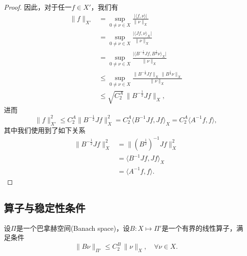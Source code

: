 \begin{proof}
因此，对于任一$f \in X'$，我们有
\begin{equation*}
  \begin{split}
    \| f \|_{X'} &= \sup_{0 \neq \nu \in X} \frac{
    \big| \langle f,\nu \rangle \big|
    }{
    \big\| \nu \big\|_{X}
    }\\
    &= \sup_{0 \neq \nu \in X}
    \frac{
    \big| \langle J f, \nu \rangle_X \big|
    }{
    \big\| \nu \big\|_X
    } \\
    &= \sup_{0 \neq \nu \in X}
    \frac{
    \big| \langle B^{-\frac{1}{2}} J f, B^{\frac{1}{2}} \nu \rangle_X \big|
    }{
    \big\| \nu \big\|_X
    } \\
    &\le \sup_{0 \neq \nu \in X}
    \frac{
    \big\| B^{-\frac{1}{2}} J f \big\|_{X} \, \big\| B^{\frac{1}{2}} \nu \big\|_{X}
    }{
    \big\| \nu \big\|_X
    } \\
    &\le \sqrt{C_2^A} \, \big\| B^{-\frac{1}{2}} J f \big\|_{X},
  \end{split}
\end{equation*}
进而
\begin{equation*}
  \big\| f \big\|_{X'}^2 \le C_2^A \big\| B^{-\frac{1}{2}} J f \big\|_{X}^2 = C_2^A \langle B^{-1} J f, J f \rangle_X = C_2^A \langle A^{-1} f, f \rangle,
\end{equation*}
其中我们使用到了如下关系
\begin{equation*}
  \begin{split}
    \big\| B^{-\frac{1}{2}} J f \big\|_{X}^2 &= \big\| \left( B^{\frac{1}{2}} \right)^{-1} J f \big\|_{X}^2 \\
    &= \langle B^{-1} J f, J f \rangle_{X} \\
    &= \langle A^{-1} f , f \rangle.
  \end{split}
\end{equation*}
\end{proof}

\subsection{算子与稳定性条件}
\label{sec:var-operator-stability-conditions}

设$\Pi$是一个巴拿赫空间(Banach space)，设$B:X \mapsto \Pi'$是一个有界的线性算子，满足条件
\begin{equation}
  \label{eq:var-stability-operator-B}
  \big\| B \nu \big\|_{\Pi'} \le C_2^B \, \big\| \nu \big\|_X, \quad \forall \nu \in X.
\end{equation}

